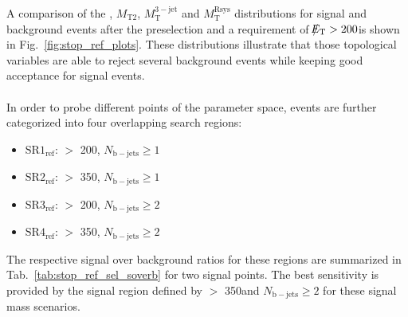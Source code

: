 A comparison of the \met, $M_\mathrm{T2}$, $M_\mathrm{T}^\mathrm{3-jet}$ and $M_\mathrm{T}^\mathrm{Rsys}$ distributions for signal and background events after the preselection and a requirement of $\slash\mkern-12mu{E}_{\text{T}} > 200$\gev is shown in Fig.~\ref{fig:stop_ref_plots}. These distributions illustrate that those topological variables are able to reject several background events while keeping good acceptance for signal events. \\ %
\\
In order to probe different points of the parameter space, events are further categorized into four overlapping search regions:
\begin{itemize}
 \item $\mathrm{SR1_{ref}}$: \met $>$ 200\gev, $N_\mathrm{b-jets} \ge 1$ 
 \item $\mathrm{SR2_{ref}}$: \met $>$ 350\gev, $N_\mathrm{b-jets} \ge 1$ 
 \item $\mathrm{SR3_{ref}}$: \met $>$ 200\gev, $N_\mathrm{b-jets} \ge 2$ 
 \item $\mathrm{SR4_{ref}}$: \met $>$ 350\gev, $N_\mathrm{b-jets} \ge 2$ 
\end{itemize}  
The respective signal over background ratios for these regions are summarized in Tab.~\ref{tab:stop_ref_sel_soverb} for two signal points. The best sensitivity is provided by the signal region defined by \met $>$ 350\gev and $N_\mathrm{b-jets} \ge 2$ for these signal mass scenarios. 
